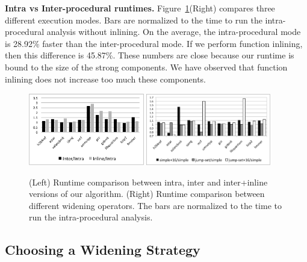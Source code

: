 \documentclass[times]{speauth}
\begin{document}
\noindent
\textbf{Intra vs Inter-procedural runtimes.}
Figure~\ref{fig:timeComp}(Right) compares three different execution modes.
Bars are normalized to the time to run the intra-procedural analysis
without inlining.
On the average, the intra-procedural mode is 28.92\% faster than the
inter-procedural mode.
If we perform function inlining, then this difference is 45.87\%.
These numbers are close because our runtime is bound to the
size of the strong components.
We have observed that function inlining does not increase too much these
components.

\begin{figure}[t!]
\begin{center}
\includegraphics[width=0.45\textwidth]{images/timeIntraInterInline}
\includegraphics[width=0.485\textwidth]{images/timeWideningOperators}
\end{center}
\caption{\label{fig:timeComp}
(Left) Runtime comparison between intra, inter and inter+inline versions of
our algorithm.
(Right) Runtime comparison between different widening operators.
The bars are normalized to the time to run the intra-procedural analysis.
}
\end{figure}

\subsection{Choosing a Widening Strategy}
\label{sub:widen}
\end{document}
